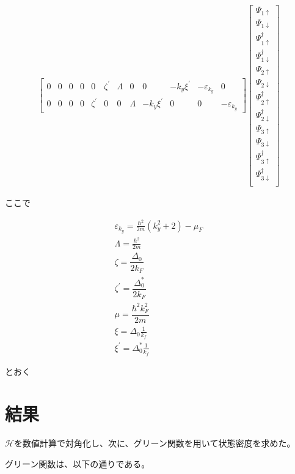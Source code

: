 \documentclass{jsarticle}
\begin{document}
\begin{align}
\begin{bmatrix}
		    		0 & 0 & 0 & 0 & 0 & \zeta^{'} & \varLambda & 0 & 0 & -k_y\xi^{'} & -\varepsilon_{k_y} & 0 \\
		    		0 & 0 & 0 & 0 & \zeta^{'} & 0 & 0 & \varLambda & -k_y\xi^{'} & 0 & 0 & -\varepsilon_{k_y}
		    	\end{bmatrix}
		    	\begin{bmatrix}
		    		\Psi_{1\uparrow} \\
		    		\Psi_{1\downarrow} \\
		    		\Psi_{1\uparrow}^\dagger \\
		    		\Psi_{1\downarrow}^\dagger \\
		    		\Psi_{2\uparrow} \\
		    		\Psi_{2\downarrow} \\
		    		\Psi_{2\uparrow}^\dagger \\
		    		\Psi_{2\downarrow}^\dagger \\
		    		\Psi_{3\uparrow} \\
		    		\Psi_{3\downarrow} \\
		    		\Psi_{3\uparrow}^\dagger \\
		    		\Psi_{3\downarrow}^\dagger \\
		    	\end{bmatrix}
		    \end{align}

	    	ここで  

	    	\begin{align}
	    		\varepsilon_{k_y}=\frac{\hbar^2}{2m}(k_y^2+2)-\mu_F \\
		    	\varLambda=\frac{\hbar^2}{2m}\\
			    \zeta=\dfrac{\Delta_0}{2k_{F}}\\
		    	\zeta^{'}=\dfrac{\Delta_0^{*}}{2k_{F}}\\
		    	\mu=\dfrac{\hbar^{2}k_F^{2}}{2m}\\
		    	\xi=\Delta_0\frac{1}{k_f} \\
		    	\xi^{'}=\Delta_0^\ast\frac{1}{k_f}
		    \end{align}

		とおく

    
            \section{結果}
            $\mathcal{H}$を数値計算で対角化し、次に、グリーン関数を用いて状態密度を求めた。

            グリーン関数は、以下の通りである。
    
\end{document}
